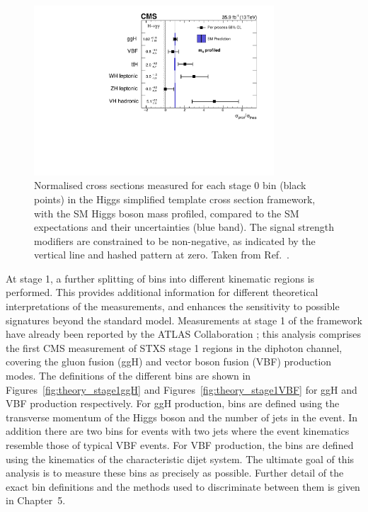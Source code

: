\begin{figure}[hptb]
  \centering
  \includegraphics[width=0.8\textwidth]{Figures/Theory/PerProcSTXS.pdf}
  \caption[Stage 0 simplified template cross section measurements from Ref.~\cite{HIG-16-040}.]
  {
    Normalised cross sections measured for each stage 0 bin (black points) 
    in the Higgs simplified template cross section framework, 
    with the SM Higgs boson mass profiled, 
    compared to the SM expectations and their uncertainties (blue band). 
    The signal strength modifiers are constrained to be non-negative, 
    as indicated by the vertical line and hashed pattern at zero.
    Taken from Ref.~\cite{HIG-16-040}.
  }
  \label{fig:theory_PerProcSTXS}
\end{figure}

At stage 1, a further splitting of bins into different kinematic regions is performed.
This provides additional information for different theoretical interpretations of the measurements, 
and enhances the sensitivity to possible signatures beyond the standard model.
Measurements at stage 1 of the framework have already been reported by the ATLAS Collaboration \cite{ATLAS_Hgg36,ATLAS_Hgg80,ATLASstage0_ZZ}; 
this analysis comprises the first CMS measurement of STXS stage 1 regions in the diphoton channel, 
covering the gluon fusion (ggH) and vector boson fusion (VBF) production modes.
The definitions of the different bins are shown in 
Figures~\ref{fig:theory_stage1ggH} and Figures~\ref{fig:theory_stage1VBF} 
for ggH and VBF production respectively.
For ggH production, bins are defined using the transverse momentum of the Higgs boson
and the number of jets in the event. 
In addition there are two bins for events with two jets where the event kinematics
resemble those of typical VBF events.
For VBF production, the bins are defined using the kinematics 
of the characteristic dijet system.
The ultimate goal of this analysis is to measure these bins as precisely as possible.
Further detail of the exact bin definitions 
and the methods used to discriminate between them is given in Chapter~5.%

